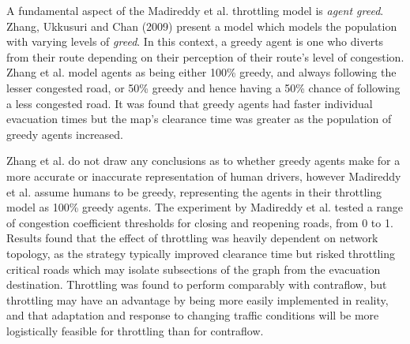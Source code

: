 A fundamental aspect of the Madireddy et al. throttling model is \textit{agent greed}. Zhang, Ukkusuri and Chan (2009) present a model which models the population with varying levels of \textit{greed}. In this context, a greedy agent is one who diverts from their route depending on their perception of their route's level of congestion. Zhang et al. model agents as being either 100\% greedy, and always following the lesser congested road, or 50\% greedy and hence having a 50\% chance of following a less congested road. It was found that greedy agents had faster individual evacuation times but the map's clearance time was greater as the population of greedy agents increased. 

Zhang et al. do not draw any conclusions as to whether greedy agents make for a more accurate or inaccurate representation of human drivers, however Madireddy et al. assume humans to be greedy, representing the agents in their throttling model as 100\% greedy agents. The experiment by Madireddy et al. tested a range of congestion coefficient thresholds for closing and reopening roads, from 0 to 1. Results found that the effect of throttling was heavily dependent on network topology, as the strategy typically improved clearance time but risked throttling critical roads which may isolate subsections of the graph from the evacuation destination. Throttling was found to perform comparably with contraflow, but throttling may have an advantage by being more easily implemented in reality, and that adaptation and response to changing traffic conditions will be more logistically feasible for throttling than for contraflow.

